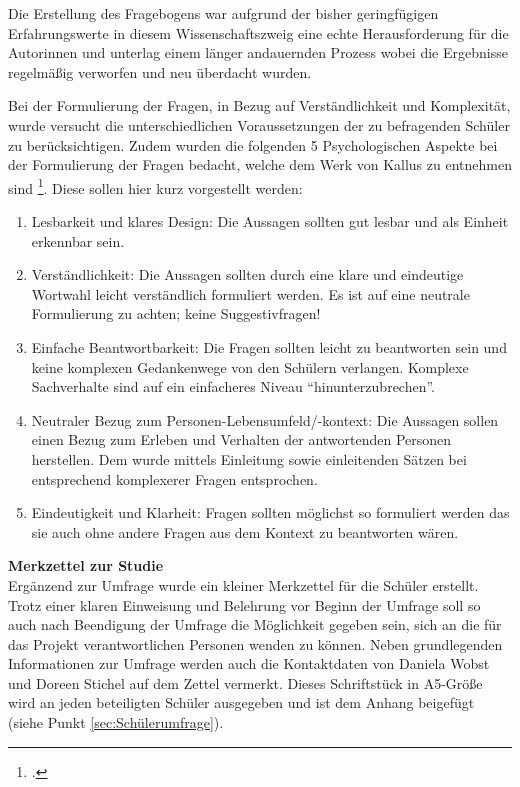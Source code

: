 Die Erstellung des Fragebogens war aufgrund der bisher geringfügigen Erfahrungswerte in diesem Wissenschaftszweig eine echte Herausforderung für die Autorinnen und unterlag einem länger andauernden Prozess wobei die Ergebnisse regelmäßig verworfen und neu überdacht wurden.
 
Bei der Formulierung der Fragen, in Bezug auf Verständlichkeit und Komplexität, wurde versucht die unterschiedlichen Voraussetzungen der zu befragenden Schüler zu berücksichtigen. Zudem wurden die folgenden 5 Psychologischen Aspekte bei der Formulierung der Fragen bedacht, welche dem Werk von Kallus zu entnehmen sind \footcite[vgl.][63-66]{Kallus2010}. Diese sollen hier kurz vorgestellt werden:\\

\begin{enumerate}
	\item Lesbarkeit und klares Design: Die Aussagen sollten gut lesbar und als Einheit erkennbar sein. 
	\item Verständlichkeit: Die Aussagen sollten durch eine klare und eindeutige Wortwahl leicht verständlich formuliert werden. Es ist auf eine neutrale Formulierung zu achten; keine Suggestivfragen!
	\item Einfache Beantwortbarkeit: Die Fragen sollten leicht zu beantworten sein und keine komplexen Gedankenwege von den Schülern verlangen. Komplexe Sachverhalte sind auf ein einfacheres Niveau "`hinunterzubrechen"'.
	\item Neutraler Bezug zum Personen-Lebensumfeld/-kontext: Die Aussagen sollen einen Bezug zum Erleben und Verhalten der antwortenden Personen herstellen. Dem wurde mittels Einleitung sowie einleitenden Sätzen bei entsprechend komplexerer Fragen entsprochen.
	\item Eindeutigkeit und Klarheit: Fragen sollten möglichst so formuliert werden das sie auch ohne andere Fragen aus dem Kontext zu beantworten wären.
\end{enumerate}

\noindent
\textbf{Merkzettel zur Studie}\\

\noindent
Ergänzend zur Umfrage wurde ein kleiner Merkzettel für die Schüler erstellt. Trotz einer klaren Einweisung und Belehrung vor Beginn der Umfrage soll so auch nach Beendigung der Umfrage die Möglichkeit gegeben sein, sich an die für das Projekt verantwortlichen Personen wenden zu können. Neben grundlegenden Informationen zur Umfrage werden auch die Kontaktdaten von Daniela Wobst und Doreen Stichel auf dem Zettel vermerkt. Dieses Schriftstück in A5-Größe wird an jeden beteiligten Schüler ausgegeben und ist dem Anhang beigefügt (siehe Punkt \ref{sec:Schülerumfrage}).\\

